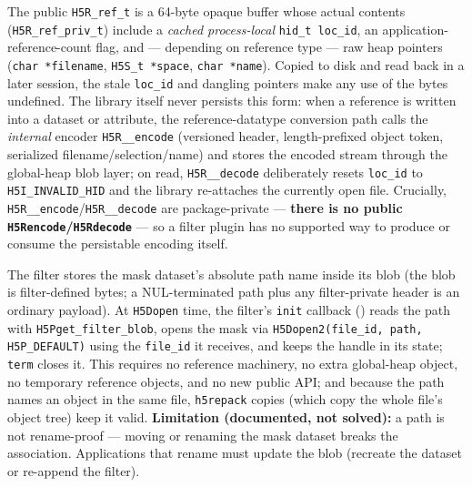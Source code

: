 \documentclass[../RFC-HDFG-2026-003.tex]{subfiles}
\begin{document}

The public \texttt{H5R\_ref\_t} is a 64-byte opaque buffer whose actual
contents (\texttt{H5R\_ref\_priv\_t}) include a \emph{cached process-local}
\texttt{hid\_t loc\_id}, an application-reference-count flag, and ---
depending on reference type --- raw heap pointers (\texttt{char
*filename}, \texttt{H5S\_t *space}, \texttt{char *name}). Copied to
disk and read back in a later session, the stale \texttt{loc\_id} and
dangling pointers make any use of the bytes undefined. The library
itself never persists this form: when a reference is written into a
dataset or attribute, the reference-datatype conversion path calls the
\emph{internal} encoder \texttt{H5R\_\_encode} (versioned header,
length-prefixed object token, serialized filename/selection/name) and
stores the encoded stream through the global-heap blob layer; on read,
\texttt{H5R\_\_decode} deliberately resets \texttt{loc\_id} to
\texttt{H5I\_INVALID\_HID} and the library re-attaches the currently
open file. Crucially, \texttt{H5R\_\_encode}/\texttt{H5R\_\_decode} are
package-private --- \textbf{there is no public
\texttt{H5Rencode}/\texttt{H5Rdecode}} --- so a filter plugin has no
supported way to produce or consume the persistable encoding itself.


The filter stores the mask dataset's absolute path name inside its blob
(the blob is filter-defined bytes; a NUL-terminated path plus any
filter-private header is an ordinary payload). At \texttt{H5Dopen} time,
the filter's \texttt{init} callback () reads the path
with \texttt{H5Pget\_filter\_blob}, opens the mask via
\texttt{H5Dopen2(file\_id, path, H5P\_DEFAULT)} using the
\texttt{file\_id} it receives, and keeps the handle in its state;
\texttt{term} closes it. This requires no
reference machinery, no extra global-heap object, no temporary
reference objects, and no new public API; and because the path names an
object in the same file, \texttt{h5repack} copies (which copy the whole
file's object tree) keep it valid. \textbf{Limitation (documented, not
solved):} a path is not rename-proof --- moving or renaming the mask
dataset breaks the association. Applications that rename must update
the blob (recreate the dataset or re-append the filter).

\end{document}
